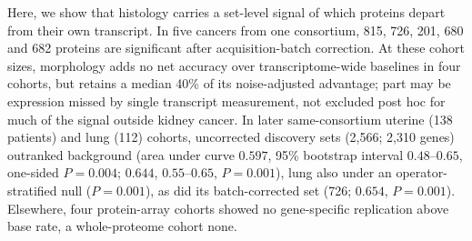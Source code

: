 \noindent Here, we show that histology carries a set-level signal of which proteins depart
from their own transcript. In five cancers from one consortium, 815, 726, 201, 680 and 682
proteins are significant after acquisition-batch correction. At these cohort sizes,
morphology adds no net accuracy over transcriptome-wide baselines in four cohorts, but
retains a median 40\% of its noise-adjusted advantage; part may be expression missed by
single transcript measurement, not excluded post hoc for much of the signal outside kidney
cancer. In later same-consortium uterine (138 patients) and
lung (112) cohorts, uncorrected discovery sets (2{,}566; 2{,}310 genes) outranked background
(area under curve $0.597$, 95\% bootstrap interval $0.48$--$0.65$, one-sided $P=0.004$;
$0.644$, $0.55$--$0.65$, $P=0.001$), lung also under an operator-stratified null
($P=0.001$), as did its batch-corrected set (726; $0.654$, $P=0.001$). Elsewhere, four
protein-array cohorts showed no gene-specific replication above base rate, a
whole-proteome cohort none.
